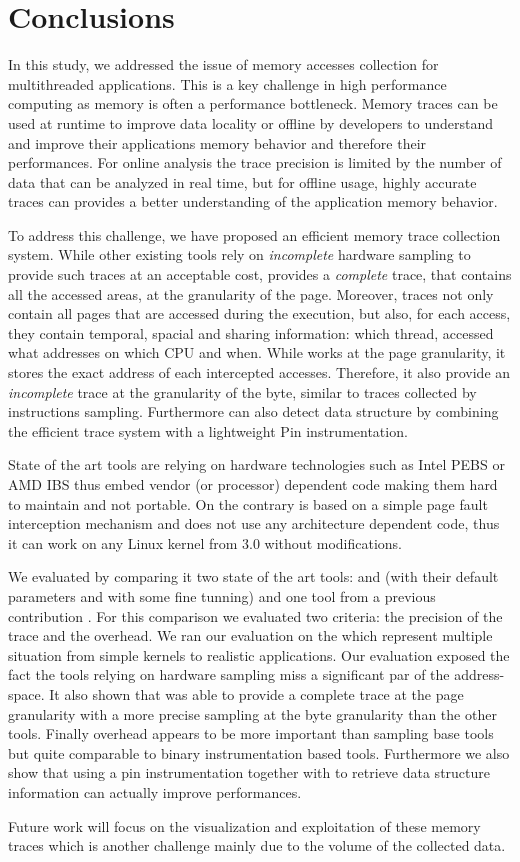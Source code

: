\section{Conclusions}
\label{sec:cncl}

In this study, we addressed the issue of memory accesses collection for
multithreaded applications. This is a key challenge in high performance
computing as memory is often a performance
bottleneck. Memory traces can be used at runtime to improve data locality or
offline by developers to understand and improve their applications memory
behavior and therefore their performances. For online analysis the trace precision
is limited by the number of data that can be analyzed in real time, but for
offline usage, highly accurate traces can provides a better understanding of
the application memory behavior.

To address this challenge, we have proposed \Moca an efficient memory trace
collection system. While other existing tools
rely on \emph{incomplete} hardware sampling to
provide such traces at an acceptable cost, \Moca provides a \emph{complete}
trace, that contains all the accessed areas, at the granularity of the page.
Moreover, \Moca traces not only
contain all pages that are accessed during the execution, but also, 
for each access, they contain temporal, spacial and sharing
information: which thread, accessed what addresses on which CPU and when.
While \Moca works at the page granularity, it stores the exact
address of each intercepted accesses. Therefore, it also provide an
\emph{incomplete} trace at the granularity of the byte, similar to
traces collected by instructions sampling. Furthermore \Moca can also detect
data structure by combining the efficient trace system with a lightweight Pin
instrumentation.

State of the art tools are relying on hardware technologies such as Intel PEBS
or AMD IBS thus embed vendor (or processor) dependent code making them hard
to maintain and not portable. On the contrary \Moca is based on a simple page
fault interception mechanism and does not use any architecture dependent code,
thus it can work on any Linux kernel from $3.0$ without modifications.

We evaluated \Moca by comparing it two state of the art tools: \Mitos and
\MemProf (with their default parameters and with some fine tunning) and one
tool from a previous contribution \TABARNAC. For this comparison we evaluated
two criteria: the precision of the trace and the overhead. We ran our
evaluation on the \NPB which represent multiple situation from simple kernels
to realistic applications. Our evaluation exposed the fact the tools
relying on hardware sampling miss a significant par of the address-space. It
also shown that \Moca was able to provide a complete trace at the page
granularity with a more precise sampling at the byte granularity than the
other tools. Finally \Moca overhead appears to be more important than sampling
base tools but quite comparable to binary instrumentation  based tools.
Furthermore we also show that using a pin instrumentation together with \Moca
to retrieve data structure information can actually improve \Moca
performances.

Future work will focus on the visualization and exploitation of these memory traces
which is another challenge mainly due to the volume of the collected data.
